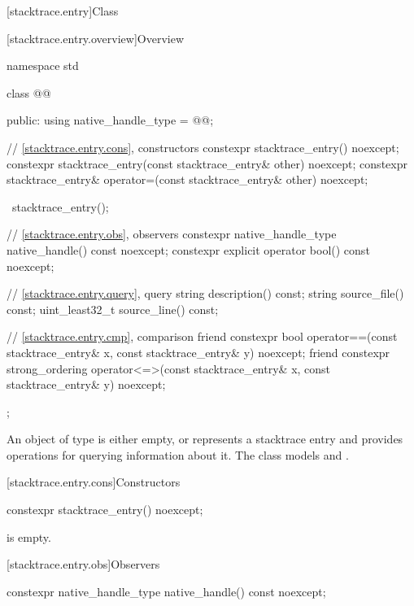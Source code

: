 [stacktrace.entry]{Class }

[stacktrace.entry.overview]{Overview}

\begin{codeblock}
namespace std {
  class @@ {
  public:
    using native_handle_type = @@;

    // \ref{stacktrace.entry.cons}, constructors
    constexpr stacktrace_entry() noexcept;
    constexpr stacktrace_entry(const stacktrace_entry& other) noexcept;
    constexpr stacktrace_entry& operator=(const stacktrace_entry& other) noexcept;

    ~stacktrace_entry();

    // \ref{stacktrace.entry.obs}, observers
    constexpr native_handle_type native_handle() const noexcept;
    constexpr explicit operator bool() const noexcept;

    // \ref{stacktrace.entry.query}, query
    string description() const;
    string source_file() const;
    uint_least32_t source_line() const;

    // \ref{stacktrace.entry.cmp}, comparison
    friend constexpr bool operator==(const stacktrace_entry& x,
                                     const stacktrace_entry& y) noexcept;
    friend constexpr strong_ordering operator<=>(const stacktrace_entry& x,
                                                 const stacktrace_entry& y) noexcept;
  };
}
\end{codeblock}

\pnum
An object of type  is either empty,
or represents a stacktrace entry and
provides operations for querying information about it.
The class  models
 and
.

[stacktrace.entry.cons]{Constructors}

%
\begin{itemdecl}
constexpr stacktrace_entry() noexcept;
\end{itemdecl}

\begin{itemdescr}
\pnum
\ensures
{} is empty.
\end{itemdescr}

[stacktrace.entry.obs]{Observers}

%
\begin{itemdecl}
constexpr native_handle_type native_handle() const noexcept;
\end{itemdecl}

